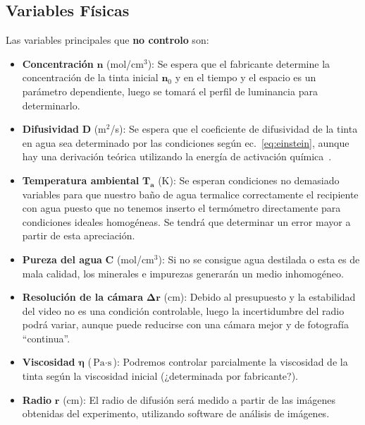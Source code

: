 \documentclass{article}[13pt]
\begin{document}
\subsection*{Variables Físicas}
Las variables principales que \textbf{no controlo} son:
\begin{itemize}
    \item \textbf{Concentración} $\mathbf{n}$ (mol/cm$^3$): Se espera que el fabricante determine la concentración de la tinta inicial $\mathbf{n}_0$ y en el tiempo y el espacio es un parámetro dependiente, luego se tomará el perfil de luminancia para determinarlo.
    \item \textbf{Difusividad} $\mathbf{D}$ (m$^2$/s): Se espera que el coeficiente de difusividad de la tinta en agua sea determinado por las condiciones según ec.~\ref{eq:einstein}, aunque hay una derivación teórica utilizando la energía de activación química~\cite{leeInkDifussionWater2004}.
    \item \textbf{Temperatura ambiental} $\mathbf{T_a}$ (K): Se esperan condiciones no demasiado variables para que nuestro baño de agua termalice correctamente el recipiente con agua puesto que no tenemos inserto el termómetro directamente para condiciones ideales homogéneas. Se tendrá que determinar un error mayor a partir de esta apreciación.
    \item \textbf{Pureza del agua} $\mathbf{C}$ (mol/cm$^3$): Si no se consigue agua destilada o esta es de mala calidad, los minerales e impurezas generarán un medio inhomogéneo.
    \item \textbf{Resolución de la cámara} $\mathbf{\Delta r}$ (cm): Debido al presupuesto y la estabilidad del video no es una condición controlable, luego la incertidumbre del radio podrá variar, aunque puede reducirse con una cámara mejor y de fotografía ``continua''.
    \item \textbf{Viscosidad} $\mathbf{\eta}$ ($\unit{\pascal} \cdot \unit{\second}$): Podremos controlar parcialmente la viscosidad de la tinta según la viscosidad inicial (¿determinada por fabricante?).
    \item \textbf{Radio} $\mathbf{r}$ (cm): El radio de difusión será medido a partir de las imágenes obtenidas del experimento, utilizando software de análisis de imágenes.
\end{itemize}
\end{document}
